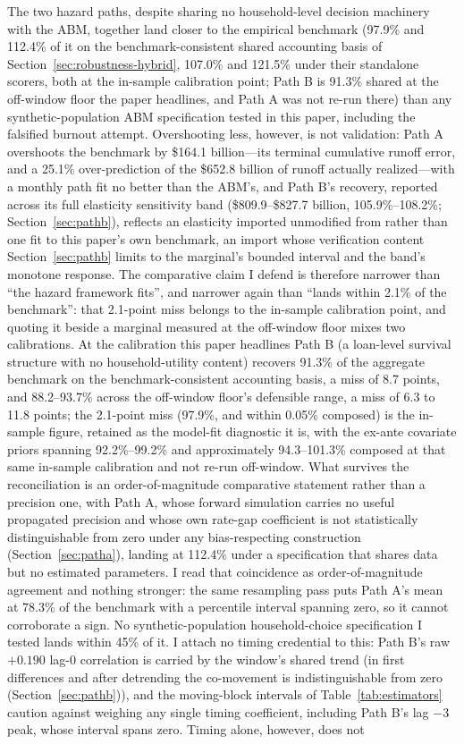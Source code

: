 \documentclass[12pt]{article}
\begin{document}
The two hazard paths, despite sharing no household-level decision machinery with the ABM, together land closer to the empirical benchmark (97.9\% and 112.4\% of it on the benchmark-consistent shared accounting basis of Section~\ref{sec:robustness-hybrid}, 107.0\% and 121.5\% under their standalone scorers, both at the in-sample calibration point; Path B is 91.3\% shared at the off-window floor the paper headlines, and Path A was not re-run there) than any synthetic-population ABM specification tested in this paper, including the falsified burnout attempt. Overshooting less, however, is not validation: Path A overshoots the benchmark by \$164.1 billion---its terminal cumulative runoff error, and a 25.1\% over-prediction of the \$652.8 billion of runoff actually realized---with a monthly path fit no better than the ABM's, and Path B's recovery, reported across its full elasticity sensitivity band (\$809.9--\$827.7 billion, 105.9\%--108.2\%; Section~\ref{sec:pathb}), reflects an elasticity imported unmodified from \citet{liebersohn2024} rather than one fit to this paper's own benchmark, an import whose verification content Section~\ref{sec:pathb} limits to the marginal's bounded interval and the band's monotone response. The comparative claim I defend is therefore narrower than ``the hazard framework fits'', and narrower again than ``lands within 2.1\% of the benchmark'': that 2.1-point miss belongs to the in-sample calibration point, and quoting it beside a marginal measured at the off-window floor mixes two calibrations. At the calibration this paper headlines Path B (a loan-level survival structure with no household-utility content) recovers 91.3\% of the aggregate benchmark on the benchmark-consistent accounting basis, a miss of 8.7 points, and 88.2--93.7\% across the off-window floor's defensible range, a miss of 6.3 to 11.8 points; the 2.1-point miss (97.9\%, and within 0.05\% composed) is the in-sample figure, retained as the model-fit diagnostic it is, with the ex-ante covariate priors spanning 92.2\%--99.2\% and approximately 94.3--101.3\% composed at that same in-sample calibration and not re-run off-window. What survives the reconciliation is an order-of-magnitude comparative statement rather than a precision one, with Path A, whose forward simulation carries no useful propagated precision and whose own rate-gap coefficient is not statistically distinguishable from zero under any bias-respecting construction (Section~\ref{sec:patha}), landing at 112.4\% under a specification that shares data but no estimated parameters. I read that coincidence as order-of-magnitude agreement and nothing stronger: the same resampling pass puts Path A's mean at 78.3\% of the benchmark with a percentile interval spanning zero, so it cannot corroborate a sign. No synthetic-population household-choice specification I tested lands within 45\% of it. I attach no timing credential to this: Path B's raw $+0.190$ lag-0 correlation is carried by the window's shared trend (in first differences and after detrending the co-movement is indistinguishable from zero (Section~\ref{sec:pathb})), and the moving-block intervals of Table~\ref{tab:estimators} caution against weighing any single timing coefficient, including Path B's lag $-3$ peak, whose interval spans zero. Timing alone, however, does not 
\end{document}
